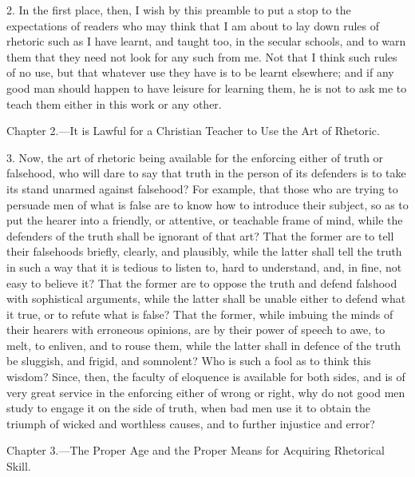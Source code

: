 2. In the first place, then, I wish by this preamble to put a stop to the expectations of readers who may think that I am about to lay  down rules of rhetoric such as I have learnt, and taught too, in the secular schools, and to warn them that they need not look for any such from me. Not that I think such rules of no use, but that whatever use they have is to be learnt elsewhere; and if any good man should happen to have leisure for learning them, he is not to ask me to teach them either in this work or any other.


Chapter 2.—It is Lawful for a Christian Teacher to Use the Art of Rhetoric.

3. Now, the art of rhetoric being available for the enforcing either of truth or falsehood, who will dare to say that truth in the person of its defenders is to take its stand unarmed against falsehood? For example, that those who are trying to persuade men of what is false are to know how to introduce their subject, so as to put the hearer into a friendly, or attentive, or teachable frame of mind, while the defenders of the truth shall be ignorant of that art? That the former are to tell their falsehoods briefly, clearly, and plausibly, while the latter shall tell the truth in such a way that it is tedious to listen to, hard to understand, and, in fine, not easy to believe it? That the former are to oppose the truth and defend falshood with sophistical arguments, while the latter shall be unable either to defend what it true, or to refute what is false? That the former, while imbuing the minds of their hearers with erroneous opinions, are by their power of speech to awe, to melt, to enliven, and to rouse them, while the latter shall in defence of the truth be sluggish, and frigid, and somnolent? Who is such a fool as to think this wisdom? Since, then, the faculty of eloquence is available for both sides, and is of very great service in the enforcing either of wrong or right, why do not good men study to engage it on the side of truth, when bad men use it to obtain the triumph of wicked and worthless causes, and to further injustice and error?


Chapter 3.—The Proper Age and the Proper Means for Acquiring Rhetorical Skill.

